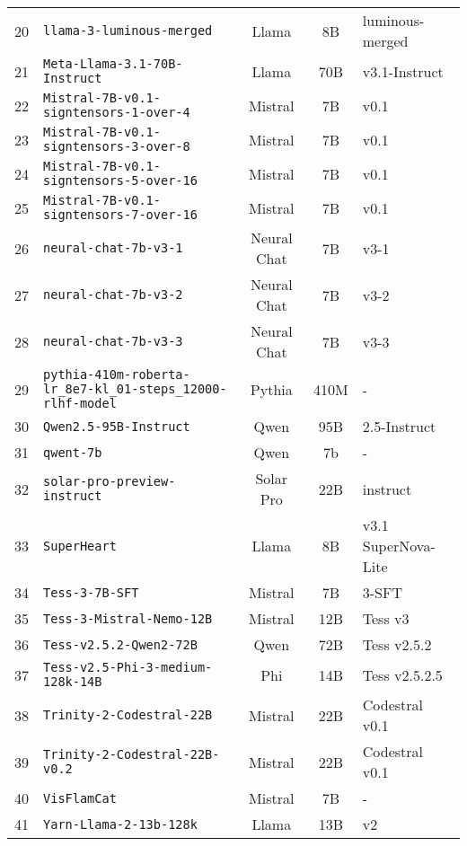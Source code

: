 \documentclass[11pt]{article}
\begin{document}
\begin{table*}[tb]
{\begin{tabular}{clccl}
    20 & \texttt{llama-3-luminous-merged} & Llama & 8B & luminous-merged \\
    21 & \texttt{Meta-Llama-3.1-70B-Instruct} & Llama & 70B & v3.1-Instruct \\
    22 & \texttt{Mistral-7B-v0.1-signtensors-1-over-4} & Mistral & 7B & v0.1 \\
    23 & \texttt{Mistral-7B-v0.1-signtensors-3-over-8} & Mistral & 7B & v0.1 \\
    24 & \texttt{Mistral-7B-v0.1-signtensors-5-over-16} & Mistral & 7B & v0.1 \\
    25 & \texttt{Mistral-7B-v0.1-signtensors-7-over-16} & Mistral & 7B & v0.1 \\
    26 & \texttt{neural-chat-7b-v3-1} & Neural Chat & 7B & v3-1 \\
    27 & \texttt{neural-chat-7b-v3-2} & Neural Chat & 7B & v3-2 \\
    28 & \texttt{neural-chat-7b-v3-3} & Neural Chat & 7B & v3-3 \\
    29 & \texttt{pythia-410m-roberta-lr\_8e7-kl\_01-steps\_12000-rlhf-model} & Pythia & 410M & -\\
    30 & \texttt{Qwen2.5-95B-Instruct} & Qwen & 95B & 2.5-Instruct \\
    31 & \texttt{qwent-7b} & Qwen & 7b & - \\
    32 & \texttt{solar-pro-preview-instruct} & Solar Pro & 22B & instruct \\
    33 & \texttt{SuperHeart} & Llama & 8B & v3.1 SuperNova-Lite \\
    34 & \texttt{Tess-3-7B-SFT} & Mistral & 7B & 3-SFT \\
    35 & \texttt{Tess-3-Mistral-Nemo-12B} & Mistral & 12B & Tess v3 \\
    36 & \texttt{Tess-v2.5.2-Qwen2-72B} & Qwen & 72B & Tess v2.5.2 \\
    37 & \texttt{Tess-v2.5-Phi-3-medium-128k-14B} & Phi & 14B & Tess v2.5.2.5 \\
    38 & \texttt{Trinity-2-Codestral-22B} & Mistral & 22B & Codestral v0.1 \\
    39 & \texttt{Trinity-2-Codestral-22B-v0.2} & Mistral & 22B & Codestral v0.1 \\
    40 & \texttt{VisFlamCat} & Mistral & 7B & - \\
    41 & \texttt{Yarn-Llama-2-13b-128k} & Llama & 13B & v2\\
        \bottomrule
    \end{tabular}
    }
    \label{tab:llms}
\end{table*}
\end{document}
